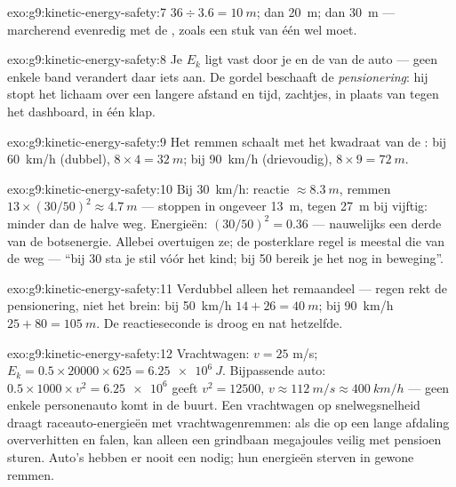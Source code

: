 \begin{solution}{exo:g9:kinetic-energy-safety:7}
$36 \div 3.6 = \qty{10}{m}$; dan \qty{20}{m}; dan \qty{30}{m} ---
marcherend evenredig met de , zoals een stuk van één
 wel moet.
\end{solution}

\begin{solution}{exo:g9:kinetic-energy-safety:8}
Je $E_k$ ligt vast door je  en de
 van de auto --- geen enkele band verandert daar iets
aan. De gordel beschaaft de \emph{pensionering}: hij stopt het lichaam
over een langere afstand en tijd, zachtjes, in plaats van tegen het
dashboard, in één klap.
\end{solution}

\begin{solution}{exo:g9:kinetic-energy-safety:9}
Het remmen schaalt met het kwadraat van de : bij
\qty{60}{km/h} (dubbel), $8 \times 4 = \qty{32}{m}$; bij \qty{90}{km/h}
(drievoudig), $8 \times 9 = \qty{72}{m}$.
\end{solution}

\begin{solution}{exo:g9:kinetic-energy-safety:10}
Bij \qty{30}{km/h}: reactie $\approx \qty{8.3}{m}$, remmen $13 \times
(30/50)^2 \approx \qty{4.7}{m}$ --- stoppen in ongeveer \qty{13}{m},
tegen \qty{27}{m} bij vijftig: minder dan de halve weg. Energieën:
$(30/50)^2 = 0.36$ --- nauwelijks een derde van de botsenergie. Allebei
overtuigen ze; de posterklare regel is meestal die van de weg --- ``bij
30 sta je stil vóór het kind; bij 50 bereik je het nog in beweging''.
\end{solution}

\begin{solution}{exo:g9:kinetic-energy-safety:11}
Verdubbel alleen het remaandeel --- regen rekt de pensionering, niet het
brein: bij \qty{50}{km/h} $14 + 26 = \qty{40}{m}$; bij \qty{90}{km/h}
$25 + 80 = \qty{105}{m}$. De reactieseconde is droog en nat hetzelfde.
\end{solution}

\begin{solution}{exo:g9:kinetic-energy-safety:12}
Vrachtwagen: $v = 25$ \unit{m/s}; $E_k = 0.5 \times 20000 \times 625 =
\qty{6.25e6}{J}$. Bijpassende auto: $0.5 \times 1000 \times v^2 =
\num{6.25e6}$ geeft $v^2 = 12500$, $v \approx \qty{112}{m/s} \approx
\qty{400}{km/h}$ --- geen enkele personenauto komt in de buurt. Een
vrachtwagen op snelwegsnelheid draagt raceauto-energieën met
vrachtwagenremmen: als die op een lange afdaling oververhitten en
falen, kan alleen een grindbaan megajoules veilig met pensioen sturen.
Auto's hebben er nooit een nodig; hun energieën sterven in gewone
remmen.
\end{solution}

